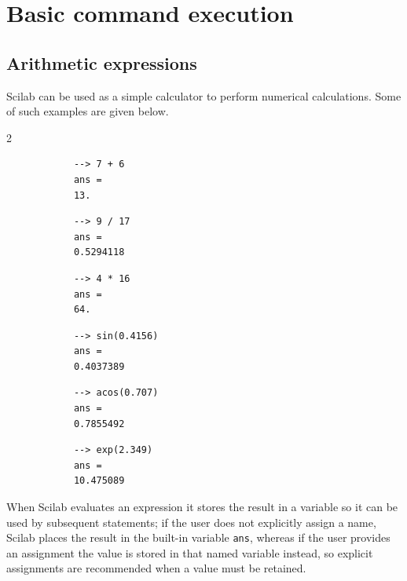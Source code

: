 \section{Basic command execution}

	\subsection{Arithmetic expressions}
		Scilab can be used as a simple calculator to perform numerical calculations. Some of such examples are given below.
		\begin{multicols}{2}
		\begin{verbatim}
			--> 7 + 6
			ans = 
			13.
		\end{verbatim}
			
		\begin{verbatim}
			--> 9 / 17
			ans = 
			0.5294118
		\end{verbatim}
		
		\begin{verbatim}
			--> 4 * 16
			ans = 
			64.
		\end{verbatim}
		
		\begin{verbatim}
			--> sin(0.4156)
			ans = 
			0.4037389
		\end{verbatim}
		
		\begin{verbatim}
			--> acos(0.707)
			ans = 
			0.7855492
		\end{verbatim}
		
		\begin{verbatim}
			--> exp(2.349)
			ans = 
			10.475089
		\end{verbatim}
		\end{multicols}
		
		When Scilab evaluates an expression it stores the result in a variable so it can be used by subsequent statements; if the user does not explicitly assign a name, Scilab places the result in the built-in variable \texttt{ans}, whereas if the user provides an assignment the value is stored in that named variable instead, so explicit assignments are recommended when a value must be retained.
		
